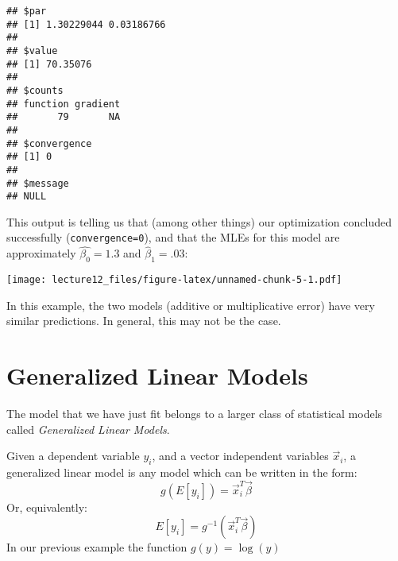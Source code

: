 \documentclass[
]{article}
\newenvironment{Shaded}{\begin{snugshade}}{\end{snugshade}}
\newcommand{\AttributeTok}[1]{\textcolor[rgb]{0.77,0.63,0.00}{#1}}
\newcommand{\DecValTok}[1]{\textcolor[rgb]{0.00,0.00,0.81}{#1}}
\newcommand{\FunctionTok}[1]{\textcolor[rgb]{0.00,0.00,0.00}{#1}}
\newcommand{\NormalTok}[1]{#1}
\newcommand{\OtherTok}[1]{\textcolor[rgb]{0.56,0.35,0.01}{#1}}
\newcommand{\SpecialCharTok}[1]{\textcolor[rgb]{0.00,0.00,0.00}{#1}}
\newcommand{\StringTok}[1]{\textcolor[rgb]{0.31,0.60,0.02}{#1}}
\begin{document}
\begin{verbatim}
## $par
## [1] 1.30229044 0.03186766
## 
## $value
## [1] 70.35076
## 
## $counts
## function gradient 
##       79       NA 
## 
## $convergence
## [1] 0
## 
## $message
## NULL
\end{verbatim}

This output is telling us that (among other things) our optimization
concluded successfully (\texttt{convergence=0}), and that the MLEs for
this model are approximately \(\hat{\beta_0}=1.3\) and
\(\hat{\beta}_1=.03\):

\begin{Shaded}
\end{Shaded}

\texttt{[image: lecture12\_files/figure-latex/unnamed-chunk-5-1.pdf]}

In this example, the two models (additive or multiplicative error) have
very similar predictions. In general, this may not be the case.

\hypertarget{generalized-linear-models}{%
\section{Generalized Linear Models}\label{generalized-linear-models}}

The model that we have just fit belongs to a larger class of statistical
models called \emph{Generalized Linear Models}.

Given a dependent variable \(y_i\), and a vector independent variables
\(\vec{x}_i\), a generalized linear model is any model which can be
written in the form: \[
g(E[y_i]) = \vec{x}_i^T \vec{\beta}
\] Or, equivalently: \[
E[y_i] = g^{-1}(\vec{x}_i^T \vec{\beta})
\] In our previous example the function \(g(y) = \log{(y)}\)
\end{document}
